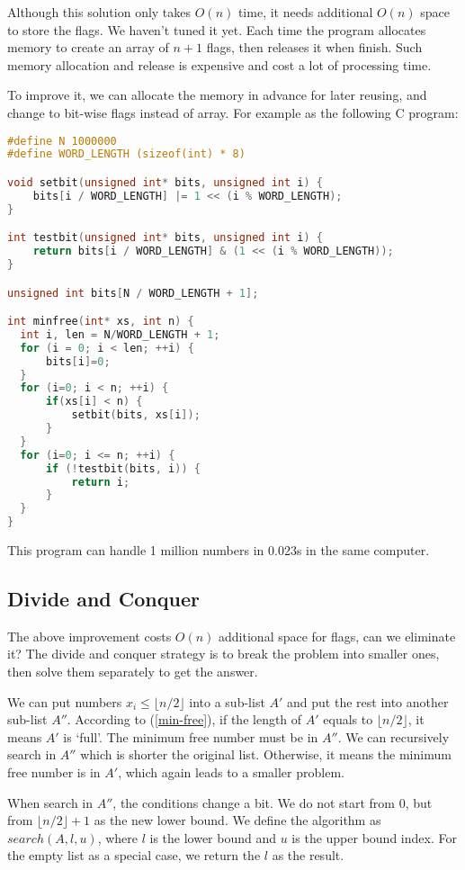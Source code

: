 \documentclass[b5paper]{article}
\begin{document}
Although this solution only takes $O(n)$ time, it needs additional $O(n)$ space to store the flags. We haven't tuned it yet. Each time the program allocates memory to create an array of $n + 1$ flags, then releases it when finish. Such memory allocation and release is expensive and cost a lot of processing time.

To improve it, we can allocate the memory in advance for later reusing, and change to bit-wise flags instead of array. For example as the following C program:

\begin{lstlisting}[language=C]
#define N 1000000
#define WORD_LENGTH (sizeof(int) * 8)

void setbit(unsigned int* bits, unsigned int i) {
    bits[i / WORD_LENGTH] |= 1 << (i % WORD_LENGTH);
}

int testbit(unsigned int* bits, unsigned int i) {
    return bits[i / WORD_LENGTH] & (1 << (i % WORD_LENGTH));
}

unsigned int bits[N / WORD_LENGTH + 1];

int minfree(int* xs, int n) {
  int i, len = N/WORD_LENGTH + 1;
  for (i = 0; i < len; ++i) {
      bits[i]=0;
  }
  for (i=0; i < n; ++i) {
      if(xs[i] < n) {
          setbit(bits, xs[i]);
      }
  }
  for (i=0; i <= n; ++i) {
      if (!testbit(bits, i)) {
          return i;
      }
  }
}
\end{lstlisting}

This program can handle 1 million numbers in 0.023s in the same computer.

\subsection{Divide and Conquer}
The above improvement costs $O(n)$ additional space for flags, can we eliminate it? The divide and conquer strategy is to break the problem into smaller ones, then solve them separately to get the answer.

We can put numbers $x_i \leq \lfloor n/2 \rfloor$ into a sub-list $A'$ and put the rest into another sub-list $A''$. According to (\ref{min-free}), if the length of $A'$ equals to $\lfloor n/2 \rfloor$, it means $A'$ is `full'. The minimum free number must be in $A''$. We can recursively search in $A''$ which is shorter the original list. Otherwise, it means the minimum free number is in $A'$, which again leads to a smaller problem.

When search in $A''$, the conditions change a bit. We do not start from $0$, but from $\lfloor n/2 \rfloor + 1$ as the new lower bound. We define the algorithm as $search(A, l, u)$, where $l$ is
the lower bound and $u$ is the upper bound index. For the empty list as a special case, we return the $l$ as the result.
\end{document}
